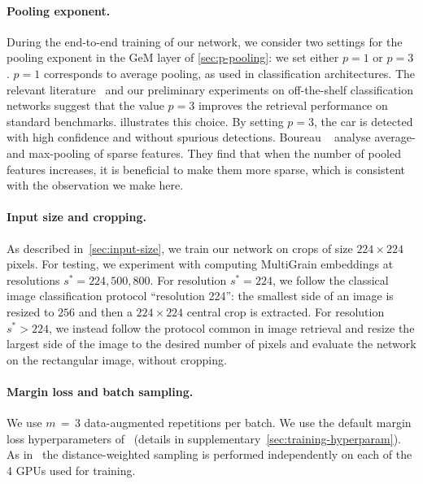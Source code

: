 \paragraph{Pooling exponent.} During the end-to-end training of our network, we consider two settings for the pooling exponent in the GeM layer of \cref{sec:p-pooling}: we set either $p=1$ or $p=3$. 
$p=1$ corresponds to average pooling, as used in classification architectures. 
The relevant literature~\cite{radenovic2018fine} and our preliminary experiments on off-the-shelf classification networks suggest that the value $p=3$ improves the retrieval performance on standard benchmarks. 
 illustrates this choice. 
%
%
%
By setting $p=3$, the car is detected with high confidence and without spurious detections. 
Boureau \etal~\cite{Boureau2010ATA} analyse average- and max-pooling of sparse features. 
They find that when the number of pooled features increases, it is beneficial to make them more sparse, which is consistent with the observation we make here. 

%


%

%

\paragraph{Input size and cropping.} As described in~\cref{sec:input-size}, we train our network on crops of size $224\times 224$ pixels.
For testing, we experiment with computing MultiGrain embeddings at resolutions $s^*=224,500,800$. 
For resolution $s^*=224$, we follow the classical image classification protocol ``resolution 224'': the smallest side of an image is resized to $256$ and then a $224\times 224$ central crop is extracted.
For resolution $s^* > 224$, we instead follow the protocol common in image retrieval and resize the largest side of the image to the desired number of pixels and evaluate the network on the rectangular image, without cropping. 

\paragraph{Margin loss and batch sampling.} We use $m$\,$=$\,3 data-augmented repetitions per batch.
We use the default margin loss hyperparameters of~\cite{wu2017sampling} (details in supplementary~\ref{sec:training-hyperparam}). 
As in~\cite{wu2017sampling} the distance-weighted sampling is performed independently on each of the 4 GPUs used for training.

